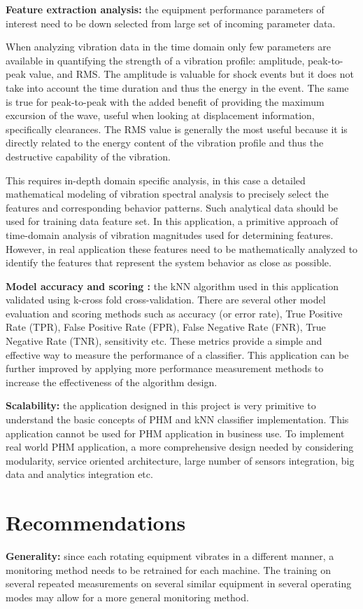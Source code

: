 \documentclass[sigconf]{acmart}
\begin{document}
\textbf{Feature extraction analysis:} the equipment performance parameters of interest need to be down selected from large set of incoming parameter data. 


When analyzing vibration data in the time domain only few parameters are available in quantifying the strength of a vibration profile: amplitude, peak-to-peak value, and RMS.  
The amplitude is valuable for shock events but it does not take into account the time duration and thus the energy in the event. The same is true for peak-to-peak with the added benefit of providing the maximum excursion of the wave, useful when looking at displacement information, specifically clearances. The RMS value is generally the most useful because it is directly related to the energy content of the vibration profile and thus the destructive capability of the vibration.


This requires in-depth domain specific analysis, in this case a detailed mathematical modeling of vibration spectral analysis to precisely select the features and corresponding behavior patterns. Such analytical data should be used for training data feature set. In this application, a primitive approach of time-domain analysis of vibration magnitudes used for determining features. However, in real application these features need to be mathematically analyzed to identify the features that represent the system behavior as close as possible.

\textbf{Model accuracy and scoring :} the kNN algorithm used in this application validated using k-cross fold cross-validation. There are several other model evaluation and scoring methods such as accuracy (or error rate), True Positive Rate (TPR), False Positive Rate (FPR), False Negative Rate (FNR), True Negative Rate (TNR), sensitivity etc. These metrics provide a simple and effective way to measure the performance of a classifier. This application can be further improved by applying more performance measurement methods to increase the effectiveness of the algorithm design.   

\textbf{Scalability:} the application designed in this project is very primitive to understand the basic concepts of PHM and kNN classifier implementation. This application cannot be used for PHM application in business use. To implement real world PHM application, a more comprehensive design needed by considering modularity, service oriented architecture, large number of sensors integration, big data and analytics integration etc.

\section{Recommendations}
\textbf{Generality:} since each rotating equipment vibrates in a different manner, a monitoring method needs to be retrained for each machine. The training on several repeated measurements on several similar equipment in several operating modes may allow for a more general monitoring method.
\end{document}
